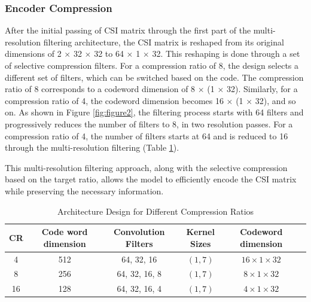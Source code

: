 \documentclass[lettersize,journal]{IEEEtran}
\begin{document}
\subsubsection{Encoder Compression}
After the initial passing of CSI matrix through the first part of the multi-resolution filtering architecture, the CSI matrix is reshaped from its original dimensions of 2 \begin{math} \times \end{math} 32 \begin{math} \times \end{math} 32 to 64 \begin{math} \times \end{math} 1 \begin{math} \times \end{math} 32. This reshaping is done through a set of selective compression filters. For a compression ratio of 8, the design selects a different set of filters, which can be switched based on the code. The compression ratio of 8 corresponds to a codeword dimension of 8 \begin{math} \times \end{math} (1 \begin{math} \times \end{math} 32). Similarly, for a compression ratio of 4, the codeword dimension becomes 16 \begin{math} \times \end{math} (1 \begin{math} \times \end{math} 32), and so on.
As shown in Figure \ref{fig:figure2}, the filtering process starts with 64 filters and progressively reduces the number of filters to 8, in two resolution passes. For a compression ratio of 4, the number of filters starts at 64 and is reduced to 16 through the multi-resolution filtering (Table \ref{table:model_comparison}).

This multi-resolution filtering approach, along with the selective compression based on the target ratio, allows the model to efficiently encode the CSI matrix while preserving the necessary information.

\begin{table}[ht]
	\caption{Architecture Design for Different Compression Ratios}
	\label{table:model_comparison}
	\centering
	\begin{tabular}{cccccc}
		\toprule
		\textbf{CR} & \textbf{Code word dimension} & \textbf{Convolution Filters} & \textbf{Kernel Sizes} & \textbf{Codeword dimension} \\
		\midrule
		4 & 512 & 64, 32, 16 & $(1,7)$ & $16 \times 1 \times 32$ \\
		8 & 256 & 64, 32, 16, 8 & $(1,7)$ & $8 \times 1 \times 32$ \\
		16 & 128 & 64, 32, 16, 4 & $(1,7)$ & $4 \times 1 \times 32$ \\
		\bottomrule
	\end{tabular}
\end{table}
\end{document}
